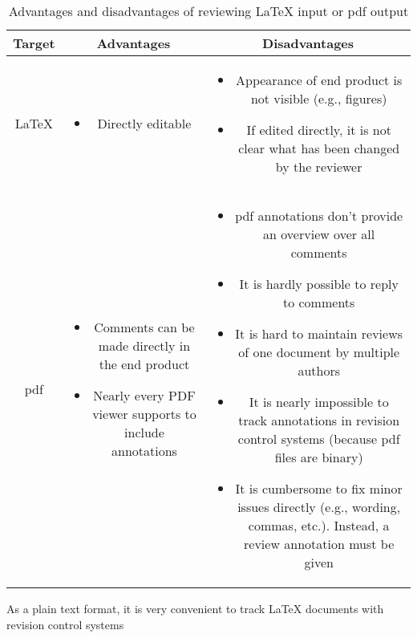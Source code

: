 \documentclass[%
	a4paper,%
	twoside%
] {article}
\begin{document}
\renewcommand{\arraystretch}{1.5}
\begin{table}[htp]
    \centering
    \caption{Advantages and disadvantages of reviewing \LaTeX{} input or
        \protect\gls{pdf} output}
    \label{tbl:review-options}
    \begin{tabular}{ccc}
    \hline
    \textbf{Target} & \textbf{Advantages} & \textbf{Disadvantages} \\
    \hline
    \LaTeX{}
        & \begin{minipage}{5cm}
            \begin{itemize}
                \item{Directly editable}
            \end{itemize}
          \end{minipage}
        & \begin{minipage}{10cm}
            \begin{itemize}
                \item{Appearance of end product is not visible (e.g., figures)}
                \item{If edited directly, it is not clear what has been changed
                     by the reviewer}
            \end{itemize}
          \end{minipage}
        \\[2em]
    \gls{pdf}
        & \begin{minipage}{5cm}
            \begin{itemize}
                \item{Comments can be made directly in the end product}
                \item{Nearly every PDF viewer supports to include annotations}
            \end{itemize}
          \end{minipage}
        & \begin{minipage}{10cm}
            \begin{itemize}
                \item{\gls{pdf} annotations don't provide an overview over
                    all comments}
                \item{It is hardly possible to reply to comments}
                \item{It is hard to maintain reviews of one document by multiple
                    authors}
                \item{It is nearly impossible to track annotations in revision
                    control systems (because \gls{pdf} files are binary)}
                \item{It is cumbersome to fix minor issues directly (e.g.,
                    wording, commas, etc.). Instead, a review annotation must be
                    given}
            \end{itemize}
          \end{minipage}
        \\
    \hline
    \end{tabular}
\end{table}

 As a
plain text format, it is very convenient to track \LaTeX{} documents with revision
control systems
\end{document}
